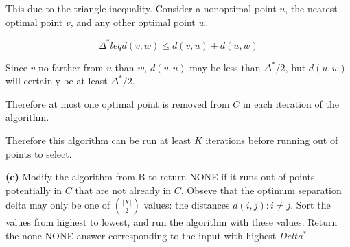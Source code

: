 \documentclass[11pt]{article}
\renewcommand{\part}[1] {\vspace{.10in} {\bf (#1)}}
\begin{document}
This due to the triangle inequality. Consider a nonoptimal point $u$, the nearest optimal point $v$, and any other optimal point $w$.

$$\Delta^{*} leq d(v,w) \leq d(v,u) + d(u,w)$$

Since $v$ no farther from  $u$ than $w$, $d(v,u)$ may be less than $\Delta^{*} / 2$, but $d(u,w)$ will certainly be at least $\Delta^{*} / 2$.

Therefore at most one optimal point is removed from $C$ in each iteration of the algorithm.

Therefore this algorithm can be run at least $K$ iterations before running out of points to select.

\part{c}
Modify the algorithm from B to return NONE if it runs out of points potentially in $C$ that are not already in $C$.
Obseve that the optimum separation delta may only be one of $\binom{|X|}{2}$ values: the distances $d(i,j) : i \neq j$.
Sort the values from highest to lowest, and run the algorithm with these values.
Return the none-NONE answer corresponding to the input with highest $Delta^{*}$
\end{document}
